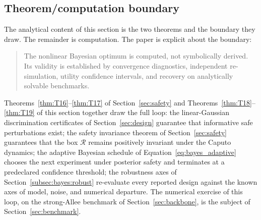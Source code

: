 \subsection{Theorem/computation boundary}

The analytical content of this section is the two theorems and the boundary they draw. The remainder is computation. The paper is explicit about the boundary:
\begin{quote}
The nonlinear Bayesian optimum is computed, not symbolically derived. Its validity is established by convergence diagnostics, independent re-simulation, utility confidence intervals, and recovery on analytically solvable benchmarks.
\end{quote}
Theorems~\ref{thm:T16}--\ref{thm:T17} of Section~\ref{sec:safety} and Theorems~\ref{thm:T18}--\ref{thm:T19} of this section together draw the full loop: the linear-Gaussian discrimination certificates of Section~\ref{sec:design} guarantee that informative safe perturbations exist; the safety invariance theorem of Section~\ref{sec:safety} guarantees that the box $\mathcal{R}$ remains positively invariant under the Caputo dynamics; the adaptive Bayesian schedule of Equation~\eqref{eq:bayes_adaptive} chooses the next experiment under posterior safety and terminates at a predeclared confidence threshold; the robustness axes of Section~\ref{subsec:bayes:robust} re-evaluate every reported design against the known axes of model, noise, and numerical departure. The numerical exercise of this loop, on the strong-Allee benchmark of Section~\ref{sec:backbone}, is the subject of Section~\ref{sec:benchmark}.
